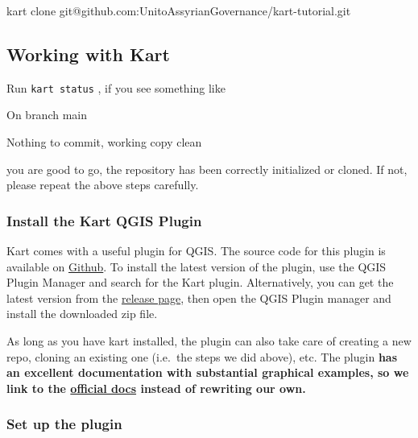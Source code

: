 \documentclass[
  letterpaper,
  DIV=11,
  numbers=noendperiod]{scrartcl}
\newenvironment{Shaded}{\begin{snugshade}}{\end{snugshade}}
\newcommand{\ExtensionTok}[1]{\textcolor[rgb]{0.55,0.91,0.99}{#1}}
\newcommand{\NormalTok}[1]{\textcolor[rgb]{0.97,0.97,0.95}{#1}}
\begin{document}
\begin{Shaded}
\begin{Highlighting}[]
\ExtensionTok{kart}\NormalTok{ clone git@github.com:UnitoAssyrianGovernance/kart{-}tutorial.git}
\end{Highlighting}
\end{Shaded}

\subsection{Working with Kart}\label{sec-working-kart}

Run \texttt{kart\ status} , if you see something like

\begin{Shaded}
\begin{Highlighting}[]
\ExtensionTok{On}\NormalTok{ branch main}

\ExtensionTok{Nothing}\NormalTok{ to commit, working copy clean}
\end{Highlighting}
\end{Shaded}

you are good to go, the repository has been correctly initialized or
cloned. If not, please repeat the above steps carefully.

\subsubsection{Install the Kart QGIS
Plugin}\label{sec-kart-plugin-install}

Kart comes with a useful plugin for QGIS. The source code for this
plugin is available on
\href{https://github.com/koordinates/kart-qgis-plugin}{Github}. To
install the latest version of the plugin, use the QGIS Plugin Manager
and search for the Kart plugin. Alternatively, you can get the latest
version from the
\href{https://github.com/koordinates/kart-qgis-plugin/releases/latest}{release
page}, then open the QGIS Plugin manager and install the downloaded zip
file.

As long as you have kart installed, the plugin can also take care of
creating a new repo, cloning an existing one (i.e.~the steps we did
above), etc. The plugin \textbf{has an excellent documentation with
substantial graphical examples, so we link to the
\href{https://github.com/koordinates/kart-qgis-plugin/blob/main/docs/index.md}{official
docs} instead of rewriting our own.}

\subsubsection{Set up the plugin}\label{set-up-the-plugin}
\end{document}
